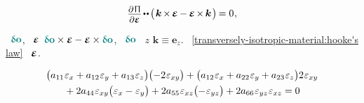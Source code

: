 \nopagebreak\vspace{-0.1em}
\begin{equation}
\label{transversely-isotropic-material:hooke's law}
\scalebox{.9}{$
   \displaystyle\frac{%
      \raisemath{-0.2em}{ \partial \hspace{.2ex} \potentialenergydensity }}%
      { \partial \infinitesimaldeformation }
$} %
\hspace{-.2ex} \dotdotp \hspace{-.2ex} %
\bigl( \hspace{.2ex}
   \bm{k}
   \hspace{-.2ex} \times \hspace{-.2ex}
   \infinitesimaldeformation
   \hspace{-.1ex} - \hspace{-.1ex}
   \infinitesimaldeformation
   \hspace{-.2ex} \times \hspace{-.2ex}
   \bm{k}
\hspace{.2ex} \bigr) \hspace{-.2ex}
= 0
\hspace{.1ex}
,
\end{equation}

\noindent
{}
~${ \varvector{\bm{o}} }$,
~$\infinitesimaldeformation$
${
   \varvector{\bm{o}} \times \infinitesimaldeformation
   - \infinitesimaldeformation \times \varvector{\bm{o}}
}$,
~$\varvector{\bm{o}}$
~$z$
${\bm{k} \equiv \bm{e}_z}$.
~\eqref{transversely-isotropic-material:hooke's law}
~$\infinitesimaldeformation$.

\noindent
\begin{multline*}\label{equationforelasticmoduliforatransverselyisotropicmaterial}
\bigl(
    a_{11} \infinitesimaldeformationcomponents{x}
  + a_{12} \infinitesimaldeformationcomponents{y}
  + a_{13} \infinitesimaldeformationcomponents{z}
\bigr)
\bigl(
  - 2 \infinitesimaldeformationcomponents{xy}
\bigr)
+
\bigl(
    a_{12} \infinitesimaldeformationcomponents{x}
  + a_{22} \infinitesimaldeformationcomponents{y}
  + a_{23} \infinitesimaldeformationcomponents{z}
\bigr) 2 \infinitesimaldeformationcomponents{xy}
\\
%
{}+ 2 a_{44} \infinitesimaldeformationcomponents{xy}
  \bigl( \infinitesimaldeformationcomponents{x} - \infinitesimaldeformationcomponents{y} \bigr)
+ 2 a_{55} \infinitesimaldeformationcomponents{xz}
  \bigl( -\infinitesimaldeformationcomponents{yz} \bigr)
+ 2 a_{66} \infinitesimaldeformationcomponents{yz} \infinitesimaldeformationcomponents{xz}
= 0
\end{multline*}

